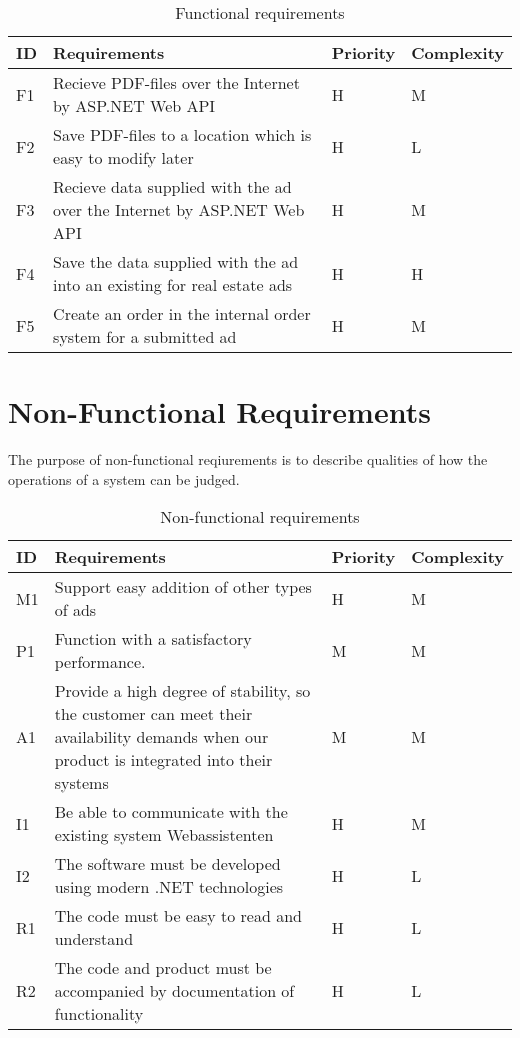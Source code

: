 \begin{table}[H]
\begin{tabular}{|p{1.5cm}|p{8cm}|p{2cm}|p{3cm}|}
	\hline
	\textbf{ID} & \textbf{Requirements} & \textbf{Priority} & \textbf{Complexity}\\
	\hline F1 & Recieve PDF-files over the Internet by ASP.NET Web API & H & M \\
	\hline
	F2 & Save PDF-files to a location which is easy to modify later & H & L \\
	\hline
	F3 & Recieve data supplied with the ad over the Internet by ASP.NET Web API & H & M \\
	\hline
	F4 & Save the data supplied with the ad into an existing for real estate ads & H & H \\
	\hline
	F5 & Create an order in the internal order system for a submitted ad & H & M \\
	\hline
	
\end{tabular}
\caption{Functional requirements}
\end{table}

\newpage
\section{Non-Functional Requirements} 

The purpose of non-functional reqiurements is to describe qualities of how the operations of a system can be judged. 

\normalsize
\begin{table}[H]
\begin{tabular}{|p{1.5cm}|p{8cm}|p{2cm}|p{3cm}|}
	\hline
	\textbf{ID} & \textbf{Requirements} & \textbf{Priority} & \textbf{Complexity}\\
	\hline
	M1 & Support easy addition of other types of ads & H & M \\
	\hline
	P1 & Function with a satisfactory performance. & M & M \\
	\hline
	A1 & Provide a high degree of stability, so the customer can meet their availability demands when our product is integrated into their systems & M & M\\
	\hline
	I1 & Be able to communicate with the existing system Webassistenten & H & M \\
	\hline
	I2 & The software must be developed using modern .NET technologies & H & L \\
	\hline
	R1 & The code must be easy to read and understand & H & L \\ 
	\hline
	R2 & The code and product must be accompanied by documentation of functionality & H & L \\
	\hline
	
	
\end{tabular}
\caption{Non-functional requirements}
\end{table}